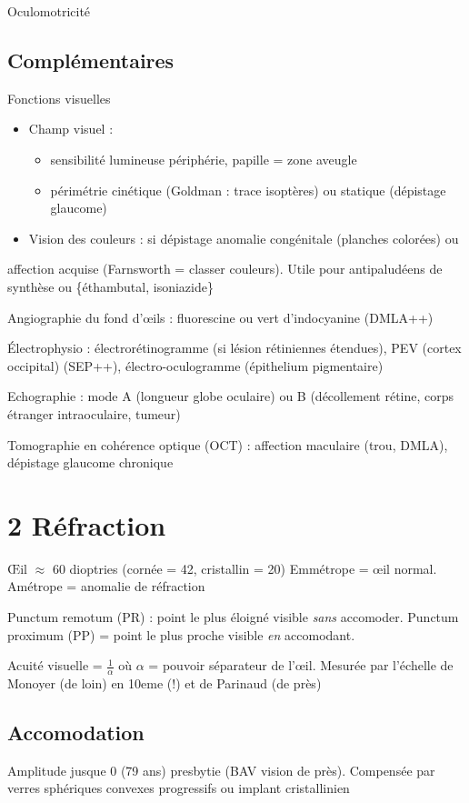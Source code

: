 \documentclass[11pt]{article}
\begin{document}
Oculomotricité

\subsection{Complémentaires}
\label{sec:org30acd9d}
Fonctions visuelles
\begin{itemize}
\item Champ visuel :
\begin{itemize}
\item sensibilité lumineuse \dec périphérie, papille = zone aveugle
\item périmétrie cinétique (Goldman : trace isoptères) ou statique (dépistage glaucome)
\end{itemize}
\item Vision des couleurs : si dépistage anomalie congénitale (planches colorées) ou
\end{itemize}
affection acquise (Farnsworth = classer couleurs). Utile pour antipaludéens de
synthèse ou \{éthambutal, isoniazide\}

Angiographie du fond d'\oe{}ils : fluorescine ou vert d'indocyanine (\gls{DMLA}++)

Électrophysio : électrorétinogramme (si lésion rétiniennes étendues), \gls{PEV} (cortex occipital) (SEP++), électro-oculogramme (épithelium pigmentaire)

Echographie : mode A (longueur globe oculaire) ou B (décollement rétine, corps
étranger intraoculaire, tumeur)

Tomographie en cohérence optique (OCT) : affection maculaire (trou, DMLA),
dépistage glaucome chronique

\section{2 Réfraction}
\label{sec:org259641b}
\OE{}il \(\approx\) 60 dioptries (cornée = 42, cristallin = 20)
Emmétrope = \oe{}il normal. Amétrope = anomalie de réfraction

Punctum remotum (PR) : point le plus éloigné visible \emph{sans} accomoder. Punctum
proximum (PP) = point le plus proche visible \emph{en} accomodant.

Acuité visuelle = \(\frac{1}{\alpha}\) où \(\alpha\) = pouvoir séparateur de
l'\oe{}il. Mesurée par l'échelle de Monoyer (de loin) en 10eme (!) et de Parinaud
(de près)

\subsection{Accomodation}
\label{sec:org5a076a5}
Amplitude \dec jusque 0 (79 ans) \thus presbytie (BAV vision de près). Compensée
par verres sphériques convexes progressifs ou implant cristallinien
\end{document}
